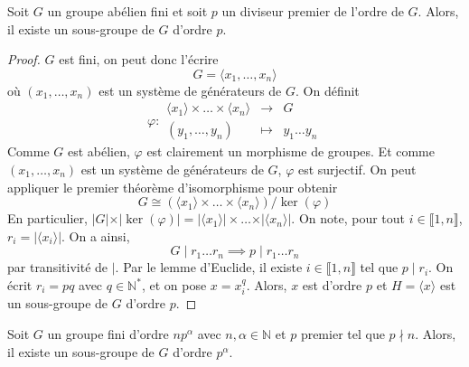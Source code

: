 






  \begin{theorem}
    \label{theoreme-de-sylow-1}
    Soit $G$ un groupe abélien fini et soit $p$ un diviseur premier de l'ordre de $G$. Alors, il existe un sous-groupe de $G$ d'ordre $p$.
  \end{theorem}

  \begin{proof}
    $G$ est fini, on peut donc l'écrire
    \[ G = \langle x_1, \dots, x_n \rangle \]
    où $(x_1, \dots, x_n)$ est un système de générateurs de $G$. On définit
    \[
      \varphi :
      \begin{array}{ccc}
        \langle x_1 \rangle \times \dots \times \langle x_n \rangle &\rightarrow& G \\
        (y_1, \dots, y_n) &\mapsto& y_1 \dots y_n
      \end{array}
    \]
    Comme $G$ est abélien, $\varphi$ est clairement un morphisme de groupes. Et comme $(x_1, \dots, x_n)$  est un système de générateurs de $G$, $\varphi$ est surjectif.
    On peut appliquer le premier théorème d'isomorphisme pour obtenir
    \[ G \cong (\langle x_1 \rangle \times \dots \times \langle x_n \rangle) / \ker(\varphi) \]
    En particulier, $\vert G \vert \times \vert \ker(\varphi) \vert = \vert \langle x_1 \rangle \vert \times \dots \times \vert \langle x_n \rangle \vert$. On note, pour tout $i \in \llbracket 1, n \rrbracket$, $r_i = \vert \langle x_i \rangle \vert$. On a ainsi,
    \[ G \mid r_1 \dots r_n \implies p \mid r_1 \dots r_n \]
    par transitivité de $\mid$. Par le lemme d'Euclide, il existe $i \in \llbracket 1, n \rrbracket$ tel que $p \mid r_i$. On écrit $r_i = pq$ avec $q \in \mathbb{N}^*$, et on pose $x = x_i^q$. Alors, $x$ est d'ordre $p$ et $H = \langle x \rangle$ est un sous-groupe de $G$ d'ordre $p$.
  \end{proof}

  \begin{theorem}
    Soit $G$ un groupe fini d'ordre $n p^\alpha$ avec $n, \alpha \in \mathbb{N}$ et $p$ premier tel que $p \nmid n$. Alors, il existe un sous-groupe de $G$ d’ordre $p^\alpha$.
  \end{theorem}

